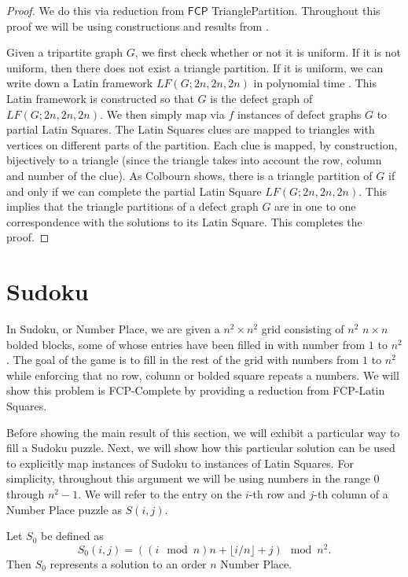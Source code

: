 \documentclass[runningheads,a4paper]{llncs}
\begin{document}
\begin{proof}
We do this via reduction from $\mathsf{FCP}$ TrianglePartition. Throughout this proof we will be using constructions and results from  \cite{colbourn1984complexity}.

Given a tripartite graph $G$, we first check whether or not it is uniform. If it is not uniform, then there does not exist a triangle partition. If it is uniform, we can write down a Latin framework $LF(G;2n,2n,2n)$ in polynomial time  \cite{colbourn1984complexity}. This Latin framework is constructed so that $G$ is the defect graph of $LF(G;2n,2n,2n)$. We then simply map via $f$ instances of defect graphs $G$ to partial Latin Squares. The Latin Squares clues are mapped to triangles with vertices on different parts of the partition. Each clue is mapped, by construction, bijectively to a triangle (since the triangle takes into account the row, column and number of the clue). As Colbourn shows, there is a triangle partition of $G$ if and only if we can complete the partial Latin Square $LF(G;2n,2n,2n)$. This implies that the triangle partitions of a defect graph $G$ are in one to one correspondence with the solutions to its Latin Square. This completes the proof. 

\end{proof}

\section{Sudoku}

In Sudoku, or Number Place, we are given a $n^2 \times n^2$ grid consisting of $n^2$ $n \times n$ bolded blocks, some of whose entries have been filled in with number from $1$ to $n^2$. The goal of the game is to fill in the rest of the grid with numbers from $1$ to $n^2$ while enforcing that no row, column or bolded square repeats a numbers. We will show this problem is FCP-Complete by providing a reduction from FCP-Latin Squares. 

Before showing the main result of this section, we will exhibit a particular way to fill a Sudoku puzzle. Next, we will show how this particular solution can be used to explicitly map instances of Sudoku to instances of Latin Squares. For simplicity, throughout this argument we will be using numbers in the range $0$ through $n^2 - 1$. We will refer to the entry on the $i$-th row and $j$-th column of a Number Place puzzle as $S(i,j)$.

\begin{proposition}
Let $S_0$ be defined as
$$S_0 (i,j) = ((i \mod n) n + \lfloor i/n \rfloor + j) \mod n^2. $$
Then $S_0$ represents a solution to an order $n$ Number Place.
\end{proposition}
\end{document}
